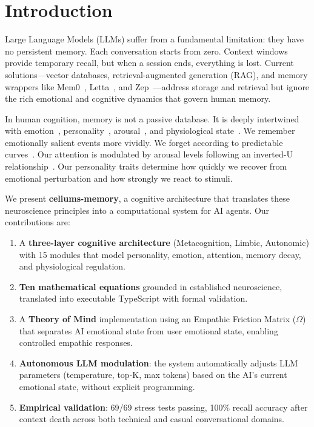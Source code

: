 \documentclass[journal,twoside]{IEEEtran}
\begin{document}
\section{Introduction}

Large Language Models (LLMs) suffer from a fundamental limitation: they have no persistent memory. Each conversation starts from zero. Context windows provide temporary recall, but when a session ends, everything is lost. Current solutions—vector databases, retrieval-augmented generation (RAG), and memory wrappers like Mem0~\cite{mem0}, Letta~\cite{letta}, and Zep~\cite{zep}—address storage and retrieval but ignore the rich emotional and cognitive dynamics that govern human memory.

In human cognition, memory is not a passive database. It is deeply intertwined with emotion~\cite{ledoux2000}, personality~\cite{costa1992}, arousal~\cite{yerkes1908}, and physiological state~\cite{craig2002}. We remember emotionally salient events more vividly. We forget according to predictable curves~\cite{ebbinghaus1885}. Our attention is modulated by arousal levels following an inverted-U relationship~\cite{yerkes1908}. Our personality traits determine how quickly we recover from emotional perturbation and how strongly we react to stimuli.

We present \textbf{celiums-memory}, a cognitive architecture that translates these neuroscience principles into a computational system for AI agents. Our contributions are:

\begin{enumerate}
    \item A \textbf{three-layer cognitive architecture} (Metacognition, Limbic, Autonomic) with 15 modules that model personality, emotion, attention, memory decay, and physiological regulation.
    \item \textbf{Ten mathematical equations} grounded in established neuroscience, translated into executable TypeScript with formal validation.
    \item A \textbf{Theory of Mind} implementation using an Empathic Friction Matrix ($\Omega$) that separates AI emotional state from user emotional state, enabling controlled empathic responses.
    \item \textbf{Autonomous LLM modulation}: the system automatically adjusts LLM parameters (temperature, top-K, max tokens) based on the AI's current emotional state, without explicit programming.
    \item \textbf{Empirical validation}: 69/69 stress tests passing, 100\% recall accuracy after context death across both technical and casual conversational domains.
\end{enumerate}
\end{document}
